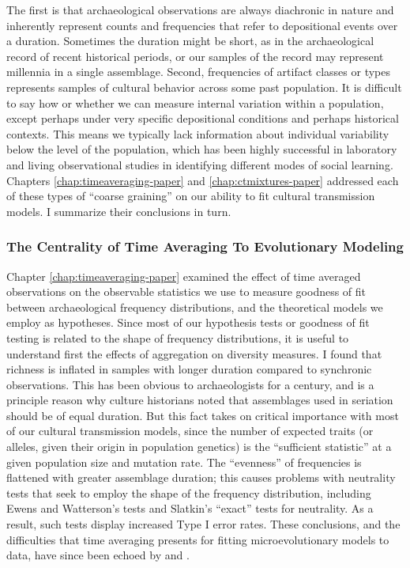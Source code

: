The first is that archaeological observations are always diachronic in nature and inherently represent counts and frequencies that refer to depositional events over a duration.  Sometimes the duration might be short, as in the archaeological record of recent historical periods, or our samples of the record may represent millennia in a single assemblage. Second, frequencies of artifact classes or types represents samples of cultural behavior across some past population.  It is difficult to say how or whether we can measure internal variation within a population, except perhaps under very specific depositional conditions and perhaps historical contexts.  This means we typically lack information about individual variability below the level of the population, which has been highly successful in laboratory and living observational studies in identifying different modes of social learning.  Chapters \ref{chap:timeaveraging-paper} and \ref{chap:ctmixtures-paper} addressed each of these types of ``coarse graining'' on our ability to fit cultural transmission models.  I summarize their conclusions in turn.

\subsubsection{The Centrality of Time Averaging To Evolutionary Modeling}\label{conc:sec:conc-timeaveraging}

Chapter \ref{chap:timeaveraging-paper} examined the effect of time averaged observations on the observable statistics we use to measure goodness of fit between archaeological frequency distributions, and the theoretical models we employ as hypotheses.  Since most of our hypothesis tests or goodness of fit testing is related to the shape of frequency distributions, it is useful to understand first the effects of aggregation on diversity measures.  I found that richness is inflated in samples with longer duration compared to synchronic observations.  This has been obvious to archaeologists for a century, and is a principle reason why culture historians noted that assemblages used in seriation should be of equal duration.  But this fact takes on critical importance with most of our cultural transmission models, since the number of expected traits (or alleles, given their origin in population genetics) is the ``sufficient statistic'' at a given population size and mutation rate.  The ``evenness'' of frequencies is flattened with greater assemblage duration; this causes problems with neutrality tests that seek to employ the shape of the frequency distribution, including Ewens and Watterson's tests and Slatkin's ``exact'' tests for neutrality.  As a result, such tests display increased Type I error rates.  These conclusions, and the difficulties that time averaging presents for fitting microevolutionary models to data, have since been echoed by \citet{Premo2014} and \citet{perreault2018time}.  

